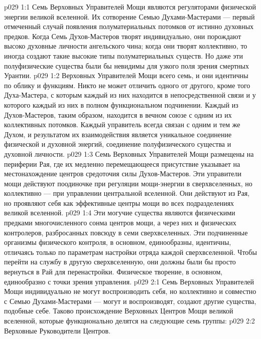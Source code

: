 \vs p029 1:1 Семь Верховных Управителей Мощи являются регуляторами физической энергии великой вселенной. Их сотворение Семью Духами\hyp{}Мастерами --- первый отмеченный случай появления полуматериальных потомков от истинно духовных предков. Когда Семь Духов\hyp{}Мастеров творят индивидуально, они порождают высоко духовные личности ангельского чина; когда они творят коллективно, то иногда создают такие высокие типы полуматериальных существ. Но даже эти полуфизические существа были бы невидимы для узкого поля зрения смертных Урантии.
\vs p029 1:2 Верховных Управителей Мощи всего семь, и они идентичны по облику и функциям. Никто не может отличить одного от другого, кроме того Духа\hyp{}Мастера, с которым каждый из них находится в непосредственной связи и у которого каждый из них в полном функциональном подчинении. Каждый из Духов\hyp{}Мастеров, таким образом, находится в вечном союзе с одним из их коллективных потомков. Каждый управитель всегда связан с одним и тем же Духом, и результатом их взаимодействия является уникальное соединение физической и духовной энергий, соединение полуфизического существа и духовной личности.
\vs p029 1:3 Семь Верховных Управителей Мощи размещены на периферии Рая, где их медленно перемещающееся присутствие указывает на местонахождение центров средоточия силы Духов\hyp{}Мастеров. Эти управители мощи действуют поодиночке при регуляции мощи\hyp{}энергии в сверхвселенных, но коллективно --- при управлении центральной вселенной. Они действуют из Рая, но проявляют себя как эффективные центры мощи во всех подразделениях великой вселенной.
\vs p029 1:4 Эти могучие существа являются физическими предками многочисленного сонма центров мощи, а через них и физических контролеров, разбросанных повсюду в семи сверхвселенных. Эти подчиненные организмы физического контроля, в основном, единообразны, идентичны, отличаясь только по параметрам настройки отряда каждой сверхвселенной. Чтобы перейти на службу в другую сверхвселенную, они должны были бы просто вернуться в Рай для перенастройки. Физическое творение, в основном, единообразно с точки зрения управления.
\vs p029 2:1 Семь Верховных Управителей Мощи индивидуально не могут воспроизводить себя, но коллективно и совместно с Семью Духами\hyp{}Мастерами --- могут и воспроизводят, создают другие существа, подобные себе. Таково происхождение Верховных Центров Мощи великой вселенной, которые функционально делятся на следующие семь группы:
\vs p029 2:2 \bibnobreakspace Верховные Руководители Центров.
